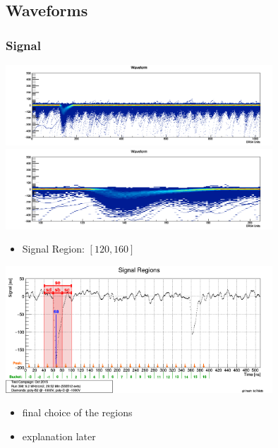 \documentclass[9pt]{beamer}
\begin{document}
\subsection{Waveforms}
\begin{frame}
	\frametitle{Signal}
	\begin{center}
		\includegraphics[width=10cm]{WF0}\\
		\includegraphics[width=10cm]{WF1}\\
	\end{center}
	\begin{itemize}
		\item Signal Region: $[120,160]$
	\end{itemize}
\end{frame}
\begin{frame}
	\begin{center}
		\includegraphics[width=10cm]{SignalRegions}
	\end{center}
	\begin{itemize}
		\item final choice of the regions
		\item explanation later
	\end{itemize}
\end{frame}
\end{document}
